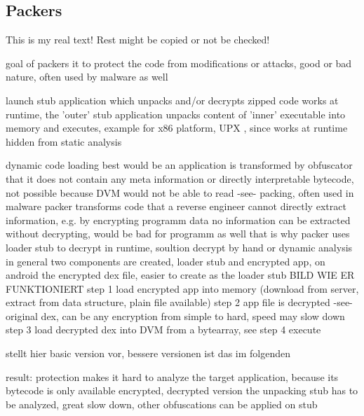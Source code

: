 \subsection{Packers}
\label{subsection:counter-reengineering-propack}
This is my real text! Rest might be copied or not be checked!

%
goal of packers it to protect the code from modifications or attacks, good or bad nature, often used by malware as well\cite{packersMalware}

launch stub application which unpacks and/or decrypts zipped code
works at runtime, the 'outer' stub application unpacks content of 'inner' executable into memory and executes, example for x86 platform, UPX \cite{sourceforgeUpx}, since works at runtime hidden from static analysis

%
dynamic code loading
best would be an application is transformed by obfuscator that it does not contain any meta information or directly interpretable bytecode, not possible because DVM would not be able to read -see- packing, often used in malware \cite{packerProblemSolution}\newline
packer transforms code that a reverse engineer cannot directly extract information, e.g. by encrypting programm data no information can be extracted without decrypting, would be bad for programm as well that is why packer uses loader stub to decrypt in runtime, soultion decrypt by hand or dynamic analysis\newline
in general two components are created, loader stub and encrypted app, on android the encrypted dex file, easier to create as the loader stub\newline
BILD WIE ER FUNKTIONIERT
step 1 load encrypted app into memory (download from server, extract from data structure, plain file available)
step 2 app file is decrypted -see- original dex, can be any encryption from simple to hard, speed may slow down
step 3 load decrypted dex into DVM from a bytearray, see \cite{schulzLabCourse}
step 4 execute\newline
\cite{blackhatPackers}\cite{yuPackers}


\cite{schulzLabCourse} stellt hier basic version vor, bessere versionen ist das im folgenden

result: protection makes it hard to analyze the target application, because its bytecode is only available encrypted, decrypted version the unpacking stub has to be analyzed, great slow down, other obfuscations can be applied on stub
%

